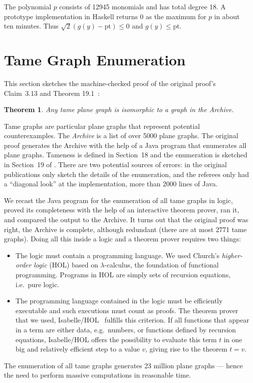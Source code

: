 \documentclass[11pt]{amsart}
\def\pt{\mathrm{pt}}
\newtheorem{thm}[subsubsection]{Theorem}
\begin{document}
The polynomial $p$ consists of 12945 monomials and has total degree 18. A
prototype implementation in Haskell returns $0$ as the maximum for $p$ in about
ten minutes. Thus $\sqrt 2 (g(y) - \pt) \le 0$ and $g(y) \le \pt$.







\section{Tame Graph Enumeration}

\label{sec:graph}

This section sketches the machine-checked proof of the original proof's Claim~3.13 and
Theorem 19.1~\cite{Hales:2006:DCG}:
\begin{thm}\label{Archive:complete}
Any tame plane graph is isomorphic to a graph in the Archive.
\end{thm}
Tame graphs are particular plane graphs that represent potential
counterexamples. The \emph{Archive} is a list of over 5000 plane
graphs.  The original proof generates the Archive with the help of a Java program that
enumerates all plane graphs. Tameness is defined
in Section~18 and the enumeration is sketched in Section~19 of
\cite{Hales:2006:DCG}. There are two potential sources of errors:
in the original publications only sketch the details of the enumeration, and the
referees only had a ``diagonal look'' at the implementation, more than 2000
lines of Java.

We recast the Java program for the enumeration of all tame graphs in
logic, proved its completeness with the help of an interactive theorem prover,
ran it, and compared the output to the
Archive.  It turns out that the original proof was right, the Archive is complete,
although redundant (there are at most 2771 tame graphs).
Doing all this inside a logic and a theorem prover requires two things:
\begin{itemize}
\item The logic must contain a programming language.
We used Church's \emph{higher-order logic} (HOL) based on $\lambda$-calculus,
the foundation of functional programming. Programs in HOL are simply
sets of recursion equations, i.e.\ pure logic.
\item The programming language contained in the logic must be efficiently
executable and such executions must count as proofs. The theorem prover that we used, Isabelle/HOL~\cite{LNCS2283} fulfills this criterion. If all functions
that appear in a term are either data, e.g.\ numbers, or functions defined
by recursion equations, Isabelle/HOL offers the possibility to evaluate this term $t$ in one big and relatively efficient step to a value $v$, giving rise to the theorem $t = v$.
\end{itemize}
The enumeration of all tame graphs generates 23 million plane graphs ---
hence the need to perform massive computations in reasonable time.
\end{document}
